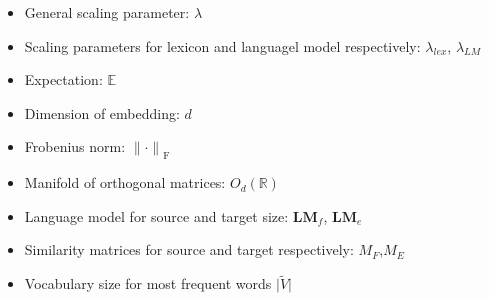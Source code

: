 \begin{itemize}
	\item General scaling parameter: $\lambda$
	\item Scaling parameters for lexicon and languagel model respectively: $\lambda_{lex}$, $\lambda_{LM}$
	\item Expectation: $\mathbb{E}$
	\item Dimension of embedding: $d$
	\item Frobenius norm: ${\lVert \cdot \rVert}_{\text{F}}$
	\item  Manifold of orthogonal matrices: $ O_d(\mathbb{R})$
	\item Language model for source and target size: $\textbf{LM}_f$, $\textbf{LM}_e$
	\item Similarity matrices for source and target respectively: $M_F$,$M_E$
	\item Vocabulary size for most frequent words ${\lvert \tilde{V} \rvert}$
\end{itemize}










